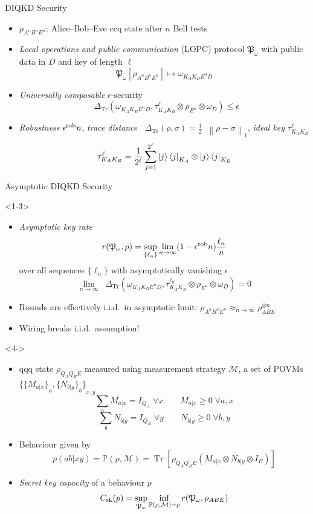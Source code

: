 \documentclass[xcolor=dvipsnames]{beamer}
\newcommand{\norm}[1]{\mathop{}\left\lVert#1\right\rVert}
\newcommand{\?}{\mathrel{?}} %
\newcommand{\Tr}[2][]{\mathop{\mathrm{Tr}#1}\left[ #2 \right]} %
\newcommand{\Trdist}[2]{\mathop{}\Delta_\mathrm{Tr}\left(#1, #2\right)}
\newcommand{\sM}{\mathcal{M}}
\newcommand{\cP}{\mathbb{P}}
\newcommand{\rob}{\rm rob}
\newcommand{\erob}[1][]{\epsilon^{\rob}_{#1}}
\newcommand{\sk}{\rm sk}
\begin{document}
\begin{frame}{DIQKD Security}
  \begin{itemize}[<+->]
    \item \(\rho_{A^n B^n E^n}\): Alice--Bob--Eve ccq state after \(n\) Bell tests
    \item \emph{Local operations and public communication} (LOPC) protocol \(\mathfrak{P}_{\omega}\) with public data in \(D\) and key of length \(\ell\)
      \[ \mathfrak{P}_{\omega}\left[\rho_{A^n B^n E^n}\right] \mapsto \omega_{K_A K_B E^n D} \]
    \item \emph{Universally composable} \(\epsilon\)-security
    \[ \Trdist{ \omega_{K_A K_B E^n D}}{\tau_{K_A K_B}^{\ell} \otimes \rho_{E^n} \otimes \omega_D } \leq \epsilon \]
    \item \emph{Robustness} \(\erob{n}\), \emph{trace distance} \(\Trdist{ \rho}{\sigma } = \frac{1}{2}\norm{\rho - \sigma}_1\), \emph{ideal key} \(\tau_{K_A K_B}^{\ell}\)
      \[ \tau_{K_A K_B}^{\ell} = \frac{1}{2^{\ell}} \sum_{j=1}^{2^{\ell}} \ket{j}\bra{j}_{K_A} \otimes \ket{j}\bra{j}_{K_B} \]
  \end{itemize}
\end{frame}

\begin{frame}{Asymptotic DIQKD Security}
  \begin{onlyenv}<1-3>
    \begin{itemize}[<+->]
    \item \emph{Asymptotic key rate}
      \[ r(\mathfrak{P}_{\omega}, \rho) = \sup_{\{\ell_n\}} \lim_{n\to\infty} (1-\erob{n}) \frac{\ell_n}{n} \]
      over all sequences \(\{\ell_n\}\) with asymptotically vanishing \(\epsilon\)
    \[ \lim_{n\to\infty} \Trdist{ \omega_{K_A K_B E^n D}}{\tau_{K_A K_B}^{\ell_n} \otimes \rho_{E^n} \otimes \omega_{D} } = 0 \]
    \item Rounds are effectively i.i.d.\ in asymptotic limit: \(\rho_{A^n B^n E^n} \approx_{n\to\infty} \rho_{ABE}^{\otimes n}\)
    \item \alert{Wiring breaks i.i.d.\ assumption!}
  \end{itemize}
  \end{onlyenv}
  \begin{onlyenv}<4->
    \begin{itemize}[<+->]
    \item qqq state \(\rho_{Q_A Q_B E}\) measured using measurement strategy \(\sM\), a set of POVMs \({\{{\{M_{a|x}\}}_{a}, {\{N_{b|y}\}}_{b}\}}_{x,y}\)
    \[ \sum_{a} M_{a|x} = I_{Q_A}\;\forall x \qquad M_{a|x} \geq 0\;\forall a, x \]
    \[ \sum_{b} N_{b|y} = I_{Q_B}\;\forall y \qquad N_{b|y} \geq 0\;\forall b, y \]
  \item Behaviour given by
      \[ p(ab|xy) = \cP(\rho, \sM) = \Tr{ \rho_{Q_A Q_B E} \left(M_{a|x} \otimes N_{b|y} \otimes I_{E}\right) } \]
    \item \emph{Secret key capacity} of a behaviour \(p\)
      \[ C_{\sk}(p) = \sup_{\mathfrak{P}_{\omega}} \inf_{ \substack{
            \cP(\rho, \sM) = p
        }
      } r(\mathfrak{P}_{\omega}, \rho_{ABE}) \]
  \end{itemize}
  \end{onlyenv}
\end{frame}
\end{document}
